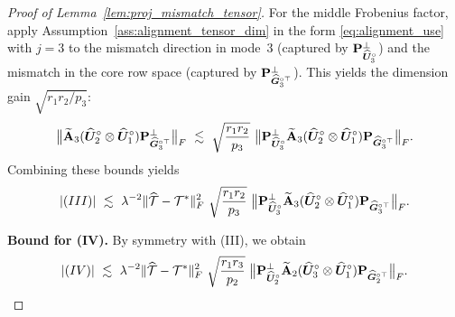 \documentclass[authoryear,preprint,review,12pt]{elsarticle}
\begin{document}
{\begin{proof}[Proof of Lemma~\ref{lem:proj_mismatch_tensor}]
		For the middle Frobenius factor, apply Assumption~\ref{ass:alignment_tensor_dim} in the form \eqref{eq:alignment_use} with $j=3$ to the mismatch direction in mode~3 (captured by
		$\mathbf{P}_{\widehat{\boldsymbol U}_3^\circ}^{\perp}$) and the mismatch in the core row space (captured by
		$\mathbf{P}_{\widehat{\boldsymbol G}_3^{\circ\top}}^{\perp}$). This yields the dimension gain $\sqrt{r_1r_2/p_3}$:
		\begin{equation}\label{eq:III_mid_gain}
			\big\|\widetilde{\bA}_3(\widehat{\bU}_2^\circ\otimes\widehat{\bU}_1^\circ)\bP_{\widehat{\bG}_3^{\circ\top}}^{\perp}\big\|_F
			\ \lesssim\
			\sqrt{\frac{r_1r_2}{p_3}}\ 
			\big\|\bP_{\widehat{\bU}_3^\circ}^{\perp}\widetilde{\bA}_3(\widehat{\bU}_2^\circ\otimes\widehat{\bU}_1^\circ)\bP_{\widehat{\bG}_3^{\circ\top}}\big\|_F.
		\end{equation}
		Combining these bounds yields
		\begin{equation}\label{eq:III_bound}
			|(III)|
			\ \lesssim\
			\lambda^{-2}\|\widehat{\mT}-\mT^\ast\|_F^2\ 
			\sqrt{\frac{r_1r_2}{p_3}}\ 
			\big\|\bP_{\widehat{\bU}_3^\circ}^{\perp}\widetilde{\bA}_3(\widehat{\bU}_2^\circ\otimes\widehat{\bU}_1^\circ)\bP_{\widehat{\bG}_3^{\circ\top}}\big\|_F.
		\end{equation}
		
		\smallskip
		\noindent\textbf{Bound for (IV).}
		By symmetry with (III), we obtain
		\begin{equation}\label{eq:IV_bound}
			|(IV)|
			\ \lesssim\
			\lambda^{-2}\|\widehat{\mT}-\mT^\ast\|_F^2\ 
			\sqrt{\frac{r_1r_3}{p_2}}\ 
			\big\|\bP_{\widehat{\bU}_2^\circ}^{\perp}\widetilde{\bA}_2(\widehat{\bU}_3^\circ\otimes\widehat{\bU}_1^\circ)\bP_{\widehat{\bG}_2^{\circ\top}}\big\|_F.
		\end{equation}
		

\end{proof}}
\end{document}
